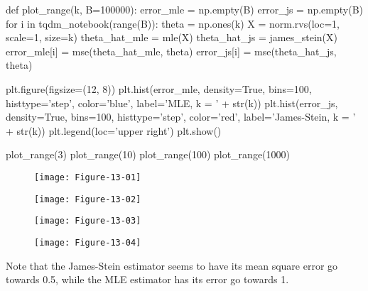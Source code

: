 \begin{python}
def plot_range(k, B=100000):
    error_mle = np.empty(B)
    error_js = np.empty(B)
    for i in tqdm_notebook(range(B)):
        theta = np.ones(k)
        X = norm.rvs(loc=1, scale=1, size=k)
        theta_hat_mle = mle(X)
        theta_hat_js = james_stein(X)
        error_mle[i] = mse(theta_hat_mle, theta)
        error_js[i] = mse(theta_hat_js, theta)

    plt.figure(figsize=(12, 8))
    plt.hist(error_mle, density=True, bins=100, histtype='step', color='blue', label='MLE, k = ' + str(k))
    plt.hist(error_js, density=True, bins=100, histtype='step', color='red', label='James-Stein, k = ' + str(k))
    plt.legend(loc='upper right')
    plt.show()
\end{python}

\begin{python}
plot_range(3)
plot_range(10)
plot_range(100)
plot_range(1000)
\end{python}

\begin{figure}[H]
\texttt{[image: Figure-13-01]}
\end{figure}

\begin{figure}[H]
\texttt{[image: Figure-13-02]}
\end{figure}

\begin{figure}[H]
\texttt{[image: Figure-13-03]}
\end{figure}

\begin{figure}[H]
\texttt{[image: Figure-13-04]}
\end{figure}

Note that the James-Stein estimator seems to have its mean square error
go towards 0.5, while the MLE estimator has its error go towards 1.
